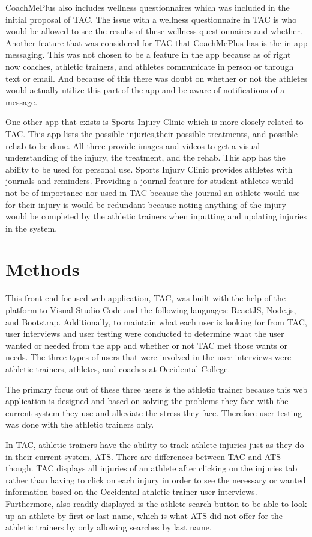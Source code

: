 \documentclass[10pt,twocolumn]{article}
\begin{document}
CoachMePlus also includes wellness questionnaires which was included in the initial proposal of TAC. The issue with a wellness questionnaire in TAC is who would be allowed to see the results of these wellness questionnaires and whether. Another feature that was considered for TAC that CoachMePlus has is the in-app messaging. This was not chosen to be a feature in the app because as of right now coaches, athletic trainers, and athletes communicate in person or through text or email. And because of this there was doubt on whether or not the athletes would actually utilize this part of the app and be aware of notifications of a message.

One other app that exists is Sports Injury Clinic\cite{sic} which is more closely related to TAC. This app lists the possible injuries,their possible treatments, and possible rehab to be done. All three provide images and videos to get a visual understanding of the injury, the treatment, and the rehab. This app has the ability to be used for personal use. Sports Injury Clinic provides athletes with journals and reminders. Providing a journal feature for student athletes would not be of importance nor used in TAC because the journal an athlete would use for their injury is would be redundant because noting anything of the injury would be completed by the athletic trainers when inputting and updating injuries in the system.

\section{Methods}
This front end focused web application, TAC, was built with the help of the platform  to Visual Studio Code and the following languages: ReactJS, Node.js, and Bootstrap. Additionally, to maintain what each user is looking for from TAC, user interviews and user testing were conducted to determine what the user wanted or needed from the app and whether or not TAC met those wants or needs. The three types of users that were involved in the user interviews were athletic trainers, athletes, and coaches at Occidental College. 

The primary focus out of these three users is the athletic trainer because this web application is designed and based on solving the problems they face with the current system they use and alleviate the stress they face. Therefore user testing was done with the athletic trainers only.

In TAC, athletic trainers have the ability to track athlete injuries just as they do in their current system, ATS. There are differences between TAC and ATS though. TAC displays all injuries of an athlete after clicking on the injuries tab rather than having to click on each injury in order to see the necessary or wanted information based on the Occidental athletic trainer user interviews. Furthermore, also readily displayed is the athlete search button to be able to look up an athlete by first or last name, which is what ATS did not offer for the athletic trainers by only allowing searches by last name.
\end{document}
